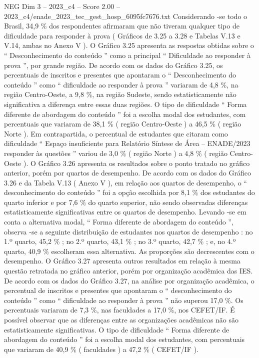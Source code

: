 \begin{textsample}{NEG Dim 3 – 2023\_c4 – Score 2.00 – 2023\_c4/enade\_2023\_tec\_gest\_hosp\_6095fc7676.txt}
Considerando -se todo o Brasil, 34,9 \% dos respondentes afirmaram que não tiveram qualquer tipo de dificuldade para responder à prova ( Gráficos de 3.25 a 3.28 e Tabelas V.13 e V.14, ambas no Anexo V ).
O Gráfico 3.25 apresenta as respostas obtidas sobre o “ Desconhecimento do conteúdo ” como a principal “ Dificuldade ao responder à prova ”, por grande região.
De acordo com os dados do Gráfico 3.25, os percentuais de inscritos e presentes que apontaram o “ Desconhecimento do conteúdo ” como “ dificuldade ao responder à prova ” variaram de 4,8 \%, na região Centro-Oeste, a 9,8 \%, na região Sudeste, sendo estatisticamente não significativa a diferença entre essas duas regiões.
O tipo de dificuldade “ Forma diferente de abordagem do conteúdo ” foi a escolha modal dos estudantes, com percentuais que variaram de 38,1 \% ( região Centro-Oeste ) a 46,5 \% ( região Norte ).
Em contrapartida, o percentual de estudantes que citaram como dificuldade “ Espaço insuficiente para Relatório Síntese de Área – ENADE/2023 responder às questões ” variou de 3,0 \% ( região Norte ) a 4,8 \% ( região Centro-Oeste ).
O Gráfico 3.26 apresenta os resultados sobre o ponto tratado no gráfico anterior, porém por quartos de desempenho.
De acordo com os dados do Gráfico 3.26 e da Tabela V.13 ( Anexo V ), em relação aos quartos de desempenho, o “ desconhecimento do conteúdo ” foi a opção escolhida por 8,1 \% dos estudantes do quarto inferior e por 7,6 \% do quarto superior, não sendo observadas diferenças estatisticamente significativas entre os quartos de desempenho.
Levando -se em conta a alternativa modal, “ Forma diferente de abordagem do conteúdo ”, observa -se a seguinte distribuição de estudantes nos quartos de desempenho : no 1.º quarto, 45,2 \% ; no 2.º quarto, 43,1 \% ; no 3.º quarto, 42,7 \% ; e, no 4.º quarto, 40,9 \% escolheram essa alternativa.
As proporções são decrescentes com o desempenho.
O Gráfico 3.27 apresenta outros resultados em relação à mesma questão retratada no gráfico anterior, porém por organização acadêmica das IES.
De acordo com os dados do Gráfico 3.27, na análise por organização acadêmica, o percentual de inscritos e presentes que apontaram o “ desconhecimento do conteúdo ” como “ dificuldade ao responder à prova ” não superou 17,0 \%.
Os percentuais variaram de 7,3 \%, nas faculdades a 17,0 \%, nos CEFET/IF.
É possível observar que as diferenças entre as organizações acadêmicas não são estatisticamente significativas.
O tipo de dificuldade “ Forma diferente de abordagem do conteúdo ” foi a escolha modal dos estudantes, com percentuais que variaram de 40,9 \% ( faculdades ) a 47,2 \% ( CEFET/IF ).

\end{textsample}
